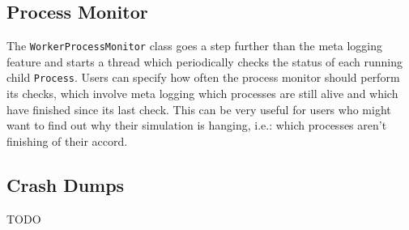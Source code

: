 \subsection{Process Monitor}\label{subsection:process_monitor}

The \texttt{WorkerProcessMonitor} class goes a step further than the meta logging feature and starts a thread which
periodically checks the status of each running child \texttt{Process}\cite{java_Process}. Users can specify how often
the process monitor should perform its checks, which involve meta logging which processes are still alive and which
have finished since its last check. This can be very useful for users who might want to find out why their simulation
is hanging, i.e.: which processes aren't finishing of their accord.

\subsection{Crash Dumps}\label{subsection:crash_dumps}

TODO
